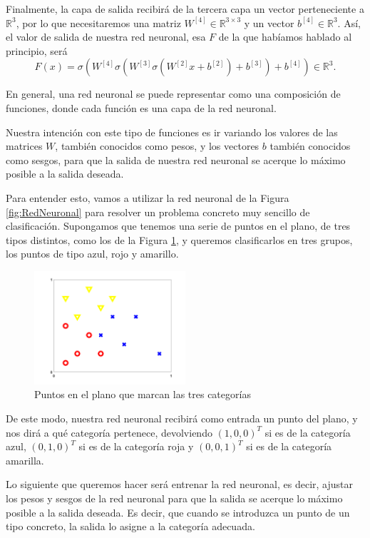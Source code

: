 \documentclass[a4paper,11pt,spanish, twoside, leqno]{tfg-uam}
\theoremstyle{definition}
\begin{document}
Finalmente, la capa de salida recibirá de la tercera capa un vector perteneciente a $\mathbb{R}^3$, por lo que necesitaremos una matriz $W^{[4]}\in\mathbb{R}^{3\times3}$ y un vector $b^{[4]}\in\mathbb{R}^3$. Así, el valor de salida de nuestra red neuronal, esa $F$ de la que habíamos hablado al principio, será
\begin{equation}
    F(x)=\sigma(W^{[4]}\sigma(W^{[3]}\sigma(W^{[2]}x+b^{[2]})+b^{[3]})+b^{[4]})\in\mathbb{R}^3.
\end{equation}\label{eq:RedNeuronal}

En general, una red neuronal se puede representar como una composición de funciones, donde cada función es una capa de la red neuronal. 

Nuestra intención con este tipo de funciones es ir variando los valores de las matrices $W$, también conocidos como pesos, y los vectores $b$ también conocidos como sesgos, para que la salida de nuestra red neuronal se acerque lo máximo posible a la salida deseada. 

Para entender esto, vamos a utilizar la red neuronal de la Figura \ref{fig:RedNeuronal} para resolver un problema concreto muy sencillo de clasificación. Supongamos que tenemos una serie de puntos en el plano, de tres tipos distintos, como los de la Figura \ref{fig:Clasificacion}, y queremos clasificarlos en tres grupos, los puntos de tipo azul, rojo y amarillo.


\begin{figure}[!ht]
    \centering
    \includegraphics[width=0.5\textwidth]{Figuras/pic_xy.png}
    \caption{Puntos en el plano que marcan las tres categorías}
    \label{fig:Clasificacion}
\end{figure}

De este modo, nuestra red neuronal recibirá como entrada un punto del plano, y nos dirá a qué categoría pertenece, devolviendo $(1,0,0)^T$ si es de la categoría azul, $(0,1,0)^T$ si es de la categoría roja y $(0,0,1)^T$ si es de la categoría amarilla.

Lo siguiente que queremos hacer será entrenar la red neuronal, es decir, ajustar los pesos y sesgos de la red neuronal para que la salida se acerque lo máximo posible a la salida deseada. Es decir, que cuando se introduzca un punto de un tipo concreto, la salida lo asigne a la categoría adecuada. 
\end{document}
